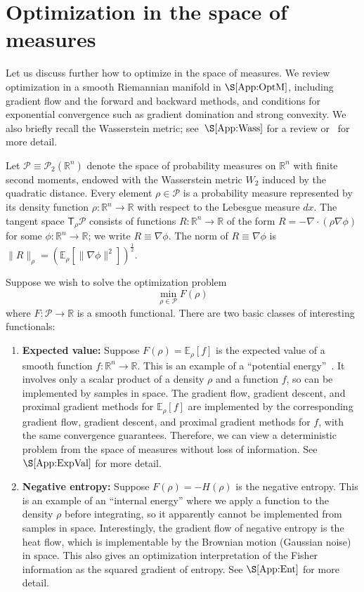 \documentclass[final,12pt]{colt2018}
\newcommand{\R}{\mathbb{R}}
\newcommand{\E}{\mathbb{E}}
\newcommand{\T}{\mathsf{T}}
\renewcommand{\P}{\mathcal{P}}
\begin{document}
\section{Optimization in the space of measures}
\label{Sec:OptMeas}

Let us discuss further how to optimize in the space of measures.
We review optimization in a smooth Riemannian manifold in $\S\ref{App:OptM}$, including gradient flow and the forward and backward methods, and conditions for exponential convergence such as gradient domination and strong convexity.
We also briefly recall the Wasserstein metric; see~$\S\ref{App:Wass}$ for a review or~\cite{Vil08} for more detail.


Let $\P \equiv \P_2(\R^n)$ denote the space of probability measures on $\R^n$ with finite second moments,
endowed with the Wasserstein metric $W_2$ induced by the quadratic distance.
Every element $\rho \in \P$ is a probability measure represented by its density function $\rho \colon \R^n \to \R$ with respect to the Lebesgue measure $dx$.
The tangent space $\T_\rho \P$ consists of functions $R \colon \R^n \to \R$ of the form $R = -\nabla \cdot (\rho \nabla \phi)$ for some $\phi \colon \R^n \to \R$;
we write $R \equiv \nabla \phi$.
The norm of $R \equiv \nabla \phi$ is $\|R\|_\rho = (\E_\rho[\|\nabla \phi\|^2])^{\frac{1}{2}}$.

Suppose we wish to solve the optimization problem
$$\min_{\rho \in \P} F(\rho)$$
where $F \colon \P \to \R$ is a smooth functional.
There are two basic classes of interesting functionals:


\begin{enumerate}
  \item {\bf Expected value:} 
  Suppose $F(\rho) = \E_\rho[f]$ is the expected value of a smooth function $f \colon \R^n \to \R$.
  This is an example of a ``potential energy''~\cite[$\S5.2.2$]{Vil03}.
  It involves only a scalar product of a density $\rho$ and a function $f$,
  so can be implemented by samples in space.
  The gradient flow, gradient descent, and proximal gradient methods for $\E_\rho[f]$ are implemented by the corresponding gradient flow, gradient descent, and proximal gradient methods for $f$, with the same convergence guarantees.
  Therefore, we can view a deterministic problem from the space of measures without loss of information.
  See $\S\ref{App:ExpVal}$ for more detail.
  
  \item {\bf Negative entropy:} 
  Suppose $F(\rho) = -H(\rho)$ is the negative entropy.
  This is an example of an ``internal energy'' where we apply a function to the density $\rho$ before integrating,
  so it apparently cannot be implemented from samples in space.
  Interestingly, the gradient flow of negative entropy is the heat flow, which is implementable by the Brownian motion (Gaussian noise) in space.
  This also gives an optimization interpretation of the Fisher information as the squared gradient of entropy.  
  See $\S\ref{App:Ent}$ for more detail.
\end{enumerate}
\end{document}
